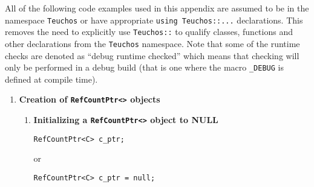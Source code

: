 \documentclass[pdf,ps2pdf,11pt]{SANDreport}
\begin{document}
All of the following code examples used in this appendix are assumed
to be in the namespace {}\texttt{Teuchos} or have appropriate
{}\texttt{using Teuchos::...} declarations.  This removes the need to
explicitly use {}\texttt{Teuchos::} to qualify classes, functions and
other declarations from the {}\texttt{Teuchos} namespace.  Note that
some of the runtime checks are denoted as ``debug runtime checked''
which means that checking will only be performed in a debug build
(that is one where the macro {}\texttt{\_DEBUG} is defined at compile time).

\begin{enumerate}

\item {\bf Creation of \texttt{RefCountPtr<>} objects}

\begin{enumerate}

\item {\bf Initializing a \texttt{RefCountPtr<>} object to NULL}
\label{rcpqs:apdx:qs:null}
%
{\small\begin{verbatim}
RefCountPtr<C> c_ptr;
\end{verbatim}}
or
{\small\begin{verbatim}
RefCountPtr<C> c_ptr = null;
\end{verbatim}}


\end{enumerate}
\end{enumerate}
\end{document}
